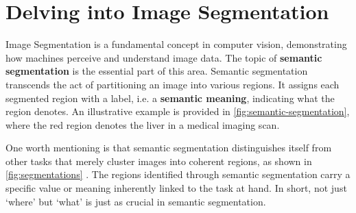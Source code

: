 \section{Delving into Image Segmentation}

Image Segmentation is a fundamental concept in computer vision, demonstrating how machines perceive and understand image data. The topic of \textbf{semantic segmentation} is the essential part of this area. Semantic segmentation transcends the act of partitioning an image into various regions. It assigns each segmented region with a label, i.e. a \textbf{semantic meaning}, indicating what the region denotes. An illustrative example is provided in \autoref{fig:semantic-segmentation}, where the red region denotes the liver in a medical imaging scan. 

One worth mentioning is that semantic segmentation distinguishes itself from other tasks that merely cluster images into coherent regions, as shown in \autoref{fig:segmentations} \cite{segmentation-mli}. The regions identified through semantic segmentation carry a specific value or meaning inherently linked to the task at hand. In short, not just `where' but `what' is just as crucial in semantic segmentation.

